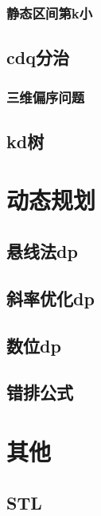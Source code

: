 \documentclass{probook}
\begin{document}
\subsection{静态区间第k小}

\section{cdq分治}
\subsection{三维偏序问题}

\section{kd树}



\chapter{动态规划}
\section{悬线法dp} 
 
\section{斜率优化dp}
 
\section{数位dp}
 
\section{错排公式}
 


\chapter{其他} 
\section{STL}
\end{document}
